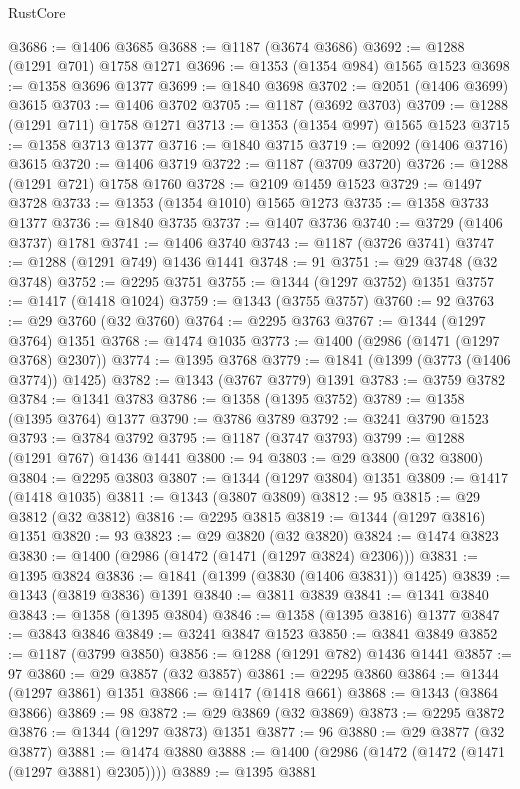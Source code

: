 \begin{lexlean}{RustCore}
\begin{coremodule}
@3686 := @1406 @3685
@3688 := @1187 (@3674 @3686)
@3692 := @1288 (@1291 @701) @1758 @1271
@3696 := @1353 (@1354 @984) @1565 @1523
@3698 := @1358 @3696 @1377
@3699 := @1840 @3698
@3702 := @2051 (@1406 @3699) @3615
@3703 := @1406 @3702
@3705 := @1187 (@3692 @3703)
@3709 := @1288 (@1291 @711) @1758 @1271
@3713 := @1353 (@1354 @997) @1565 @1523
@3715 := @1358 @3713 @1377
@3716 := @1840 @3715
@3719 := @2092 (@1406 @3716) @3615
@3720 := @1406 @3719
@3722 := @1187 (@3709 @3720)
@3726 := @1288 (@1291 @721) @1758 @1760
@3728 := @2109 @1459 @1523
@3729 := @1497 @3728
@3733 := @1353 (@1354 @1010) @1565 @1273
@3735 := @1358 @3733 @1377
@3736 := @1840 @3735
@3737 := @1407 @3736
@3740 := @3729 (@1406 @3737) @1781
@3741 := @1406 @3740
@3743 := @1187 (@3726 @3741)
@3747 := @1288 (@1291 @749) @1436 @1441
@3748 := 91
@3751 := @29 @3748 (@32 @3748)
@3752 := @2295 @3751
@3755 := @1344 (@1297 @3752) @1351
@3757 := @1417 (@1418 @1024)
@3759 := @1343 (@3755 @3757)
@3760 := 92
@3763 := @29 @3760 (@32 @3760)
@3764 := @2295 @3763
@3767 := @1344 (@1297 @3764) @1351
@3768 := @1474 @1035
@3773 := @1400 (@2986 (@1471 (@1297 @3768) @2307))
@3774 := @1395 @3768
@3779 := @1841 (@1399 (@3773 (@1406 @3774)) @1425)
@3782 := @1343 (@3767 @3779) @1391
@3783 := @3759 @3782
@3784 := @1341 @3783
@3786 := @1358 (@1395 @3752)
@3789 := @1358 (@1395 @3764) @1377
@3790 := @3786 @3789
@3792 := @3241 @3790 @1523
@3793 := @3784 @3792
@3795 := @1187 (@3747 @3793)
@3799 := @1288 (@1291 @767) @1436 @1441
@3800 := 94
@3803 := @29 @3800 (@32 @3800)
@3804 := @2295 @3803
@3807 := @1344 (@1297 @3804) @1351
@3809 := @1417 (@1418 @1035)
@3811 := @1343 (@3807 @3809)
@3812 := 95
@3815 := @29 @3812 (@32 @3812)
@3816 := @2295 @3815
@3819 := @1344 (@1297 @3816) @1351
@3820 := 93
@3823 := @29 @3820 (@32 @3820)
@3824 := @1474 @3823
@3830 := @1400 (@2986 (@1472 (@1471 (@1297 @3824) @2306)))
@3831 := @1395 @3824
@3836 := @1841 (@1399 (@3830 (@1406 @3831)) @1425)
@3839 := @1343 (@3819 @3836) @1391
@3840 := @3811 @3839
@3841 := @1341 @3840
@3843 := @1358 (@1395 @3804)
@3846 := @1358 (@1395 @3816) @1377
@3847 := @3843 @3846
@3849 := @3241 @3847 @1523
@3850 := @3841 @3849
@3852 := @1187 (@3799 @3850)
@3856 := @1288 (@1291 @782) @1436 @1441
@3857 := 97
@3860 := @29 @3857 (@32 @3857)
@3861 := @2295 @3860
@3864 := @1344 (@1297 @3861) @1351
@3866 := @1417 (@1418 @661)
@3868 := @1343 (@3864 @3866)
@3869 := 98
@3872 := @29 @3869 (@32 @3869)
@3873 := @2295 @3872
@3876 := @1344 (@1297 @3873) @1351
@3877 := 96
@3880 := @29 @3877 (@32 @3877)
@3881 := @1474 @3880
@3888 := @1400 (@2986 (@1472 (@1472 (@1471 (@1297 @3881) @2305))))
@3889 := @1395 @3881

\end{coremodule}
\end{lexlean}
